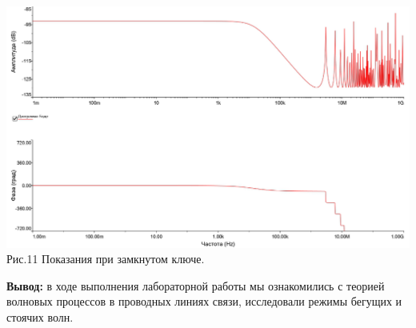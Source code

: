 \documentclass[11pt]{article}
\begin{document}
\begin{center}
    \includegraphics[width=1\linewidth]{img/fourth2.png}
        Рис.11 Показания при замкнутом ключе.
\end{center}


\textbf{Вывод:} в ходе выполнения лабораторной работы мы ознакомились с теорией волновых процессов в проводных линиях связи, исследовали режимы бегущих и стоячих волн.
\end{document}
